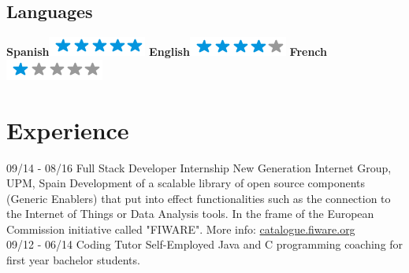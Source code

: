 \documentclass[]{friggeri-cv}
\begin{document}
\begin{aside}
  \section{Languages}
    \textbf{Spanish}\includegraphics[scale=0.40]{img/5stars.png}
    \textbf{English}\includegraphics[scale=0.40]{img/4stars.png}
    \textbf{French}\includegraphics[scale=0.40]{img/1stars.png}
\end{aside}

\section{Experience}
\begin{entrylist}
  \entry
    {09/14 - 08/16}
    {Full Stack Developer Internship}
    {New Generation Internet Group, UPM, Spain}
    {Development of a scalable library of open source components (Generic Enablers) that put into effect functionalities such as the connection to the Internet of Things or Data Analysis tools. In the frame of the European Commission initiative called "FIWARE". More info: \href{http://catalogue.fiware.org}{catalogue.fiware.org}\\}
  \entry
    {09/12 - 06/14}
    {Coding Tutor}
    {Self-Employed}
    {Java and C programming coaching for first year bachelor students.}
\end{entrylist}
\end{document}
